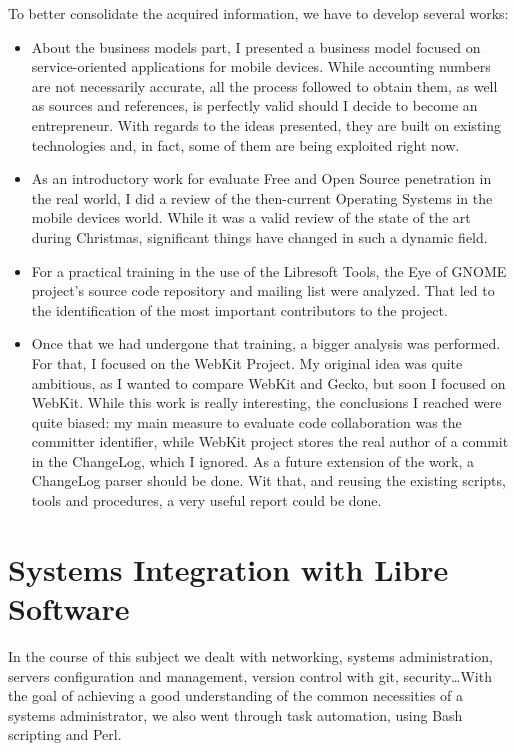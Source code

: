 To better consolidate the acquired information, we have to develop several works:
\begin{itemize}
\item About the business models part, I presented a business model focused on service-oriented
applications for mobile devices\cite{businessmodel}. While accounting numbers are not necessarily accurate,
all the process followed to obtain them, as well as sources and references, is perfectly valid
should I decide to become an entrepreneur. With regards to the ideas presented,
they are built on existing technologies and, in fact, some of them are being
exploited right now.

\item As an introductory work for evaluate Free and Open Source penetration in the
real world, I did a review of the then-current Operating Systems in the mobile devices world\cite{osmobile}.
While it was a valid review of the state of the art during Christmas, significant things
have changed in such a dynamic field.

\item For a practical training in the use of the Libresoft Tools, the Eye of GNOME project's
source code repository and mailing list were analyzed\cite{eogtraining}. That led to the identification of 
the most important contributors to the project.

\item Once that we had undergone that training, a bigger analysis was performed. For
that, I focused on the WebKit Project\cite{webkit:home, wiki:webkit}. My original idea was
quite ambitious, as I wanted to compare WebKit and Gecko, but soon I focused on WebKit.
While this work\cite{webkitreport} is really interesting, the conclusions I reached were quite biased: 
my main measure to evaluate code collaboration was the committer identifier,
while WebKit project stores the real author of a commit in the ChangeLog, which I ignored.
As a future extension of the work, a ChangeLog parser should be done. Wit that, and 
reusing the existing scripts, tools and procedures, a very useful report could be done.

\end{itemize}

\section{Systems Integration with Libre Software}

In the course of this subject we dealt with networking, systems administration, servers configuration
and management, version control with git, security\dots With the goal of achieving a good understanding
of the common necessities of a systems administrator, we also went through task automation, using Bash
scripting and Perl.

